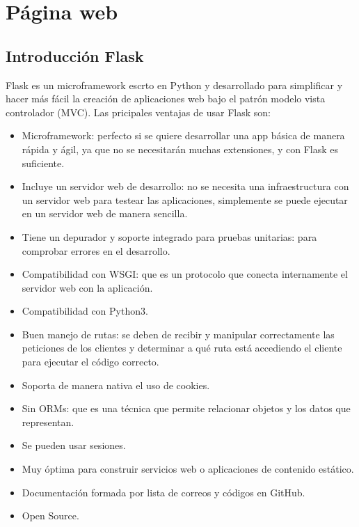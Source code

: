 \documentclass[10pt]{book}
\begin{document}
\chapter{Página web}

\section{Introducción Flask}\cite{openwebinars_flask} \cite{flask_docs}
    Flask es un microframework escrto en Python y desarrollado para simplificar y hacer más fácil la creación de aplicaciones web bajo el patrón modelo vista controlador (MVC). Las pricipales ventajas de usar Flask son:
        \begin{itemize}
            \item Microframework: perfecto si se quiere desarrollar una app básica de manera rápida y ágil, ya que no se necesitarán muchas extensiones, y con Flask es suficiente.
            \item Incluye un servidor web de desarrollo: no se necesita una infraestructura con un servidor web para testear las aplicaciones, simplemente se puede ejecutar en un servidor web de manera sencilla.
            \item Tiene un depurador y soporte integrado para pruebas unitarias: para comprobar errores en el desarrollo.
            \item Compatibilidad con WSGI: que es un protocolo que conecta internamente el servidor web con la aplicación.
            \item Compatibilidad con Python3.
            \item Buen manejo de rutas: se deben de recibir y manipular correctamente las peticiones de los clientes y determinar a qué ruta está accediendo el cliente para ejecutar el código correcto.
            \item Soporta de manera nativa el uso de cookies.
            \item Sin ORMs: que es una técnica que permite relacionar objetos y los datos que representan.
            \item Se pueden usar sesiones.
            \item Muy óptima para construir servicios web o aplicaciones de contenido estático.
            \item Documentación formada por lista de correos y códigos en GitHub.
            \item Open Source.
        \end{itemize}
\end{document}
